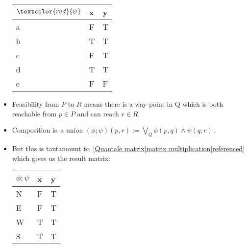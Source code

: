 \begin{itemize}
          \begin{minipage}{0.48\textwidth}

            \begin{tabular}{|l|l|l|}
              \hline
              $\textcolor{red}{\psi}$ & x & y \\ \hline
              a                       & F & T \\ \hline
              b                       & T & T \\ \hline
              c                       & F & T \\ \hline
              d                       & T & T \\ \hline
              e                       & F & F \\ \hline
            \end{tabular}
          \end{minipage}

    \item Feasibility from $P$ to $R$ means there is a way-point in Q which is both reachable from $p \in P$ and can reach $r \in R$.
    \item Composition is \,a union $(\phi;\psi)(p,r):= \bigvee_Q \phi(p,q)\land \psi(q,r)$\,.
    \item But this is tantamount to \,\ref{Quantale matrix|matrix multiplication|referenced}\, which gives us the result matrix:


          \begin{minipage}{0.48\textwidth}

            \begin{tabular}{|l|l|l|}
              \hline
              $\phi;\psi$ & x & y \\ \hline
              N           & F & T \\ \hline
              E           & F & T \\ \hline
              W           & T & T \\ \hline
              S           & T & T \\ \hline
            \end{tabular}
          \end{minipage}

  \end{itemize}
